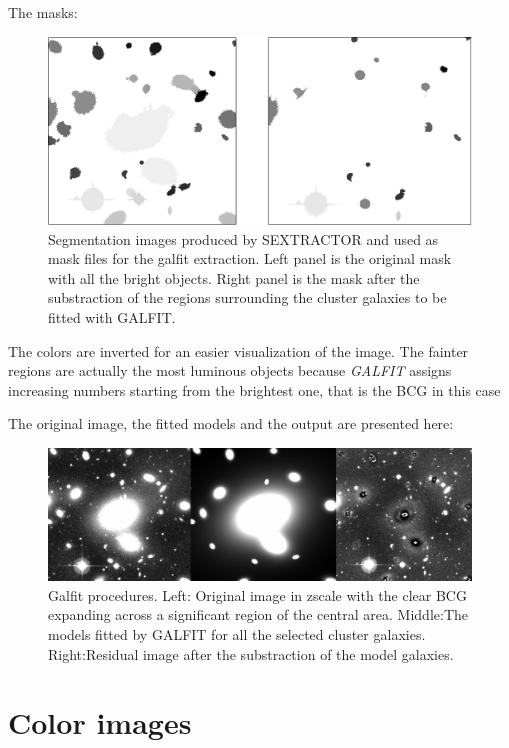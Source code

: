 The masks:

\begin{figure}[H]
\centering
\includegraphics[width=15cm]{images/masks.png}
\caption[Segmentation images]{Segmentation images produced by SEXTRACTOR and used as mask files for the galfit extraction. Left panel is the original mask with all the bright objects. Right panel is the mask after the substraction of the regions surrounding the cluster galaxies to be fitted with GALFIT.}
\end{figure}

The colors are inverted for an easier visualization of the image. The fainter regions are actually the most luminous objects because \textit{GALFIT} assigns increasing numbers starting from the brightest one, that is the BCG in this case

The original image, the fitted models and the output are presented here:

\begin{figure}[H]
\centering
\includegraphics[width=15cm]{images/galfit.png}
\caption[Galfit results]{Galfit procedures. Left: Original image in zscale with the clear BCG expanding across a significant region of the central area. Middle:The models fitted by GALFIT for all the selected cluster galaxies. Right:Residual image after the substraction of the model galaxies.}
\end{figure}

\section{Color images} 

